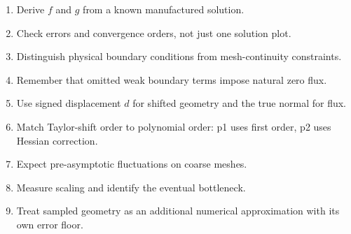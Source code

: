 \documentclass[11pt]{article}
\begin{document}
\begin{enumerate}[leftmargin=*]
\item Derive $f$ and $g$ from a known manufactured solution.
\item Check errors and convergence orders, not just one solution plot.
\item Distinguish physical boundary conditions from mesh-continuity constraints.
\item Remember that omitted weak boundary terms impose natural zero flux.
\item Use signed displacement $d$ for shifted geometry and the true normal for flux.
\item Match Taylor-shift order to polynomial order: p1 uses first order, p2 uses Hessian correction.
\item Expect pre-asymptotic fluctuations on coarse meshes.
\item Measure scaling and identify the eventual bottleneck.
\item Treat sampled geometry as an additional numerical approximation with its own error floor.
\end{enumerate}
\end{document}

